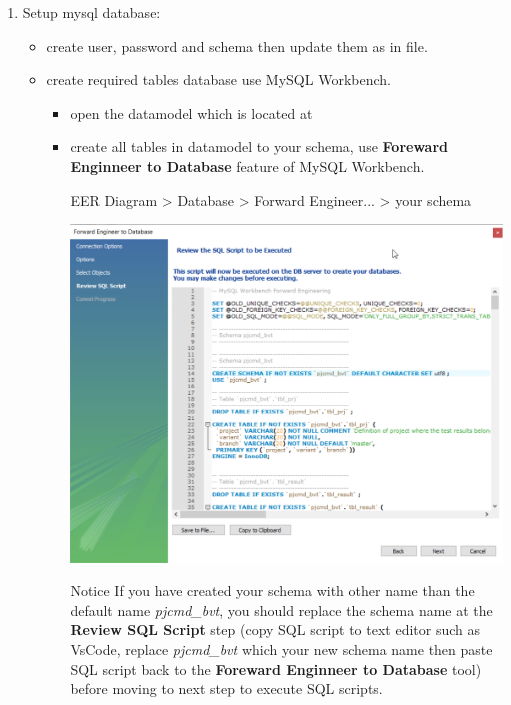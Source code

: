 \begin{enumerate}
\item Setup mysql database:
   \begin{itemize}
   \item create user, password and schema then update them as 
          in  
         file.
   \item create required tables database use MySQL Workbench.
   \begin{itemize}
      \item open the datamodel which is located at
      \item create all tables in datamodel to your schema, use 
            \textbf{Foreward Enginneer to Database} feature of MySQL Workbench.
   \begin{robotlog}
   EER Diagram > Database > Forward Engineer... > your schema
   \end{robotlog}
   \includegraphics[width=1\linewidth]{./pictures/forward_engineer.png}
   \begin{boxhint}{Notice}
   If you have created your schema with other name than the default 
   name \emph{pjcmd\_bvt}, you should replace the schema name at the \textbf{Review
   SQL Script} step (copy SQL script to text editor such as VsCode, replace 
   \emph{pjcmd\_bvt} which your new schema name then paste SQL script back to the 
   \textbf{Foreward Enginneer to Database} tool) before moving to next step to 
   execute SQL scripts.
   \end{boxhint}


\end{itemize}
\end{itemize}
\end{enumerate}
